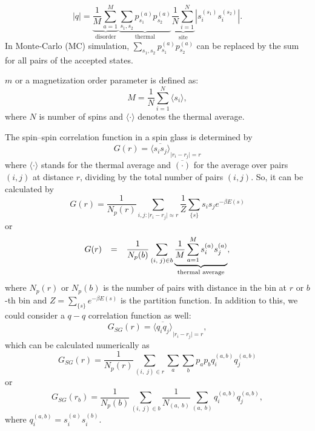 \documentclass[
    aps,
    prb,
    reprint,           %
    superscriptaddress,%
    amsmath,amssymb,
    floatfix
]{revtex4-2}
\begin{document}
 \begin{equation}
\left|q\right|=\underset{\text{disorder}}{\underbrace{\frac{1}{M}\sum_{a=1}^M}}\underset{\text{thermal}}{\underbrace{\sum_{s_1,s_2} p_{s_1}^{(a)}p_{s_2}^{(a)}}}\underset{\text{site}}{\underbrace{\frac{1}{N}\sum_{i=1}^{N}}}\left|s_i^{\left(s_1\right)}s_i^{\left(s_2\right)}\right|.
 \label{eq:18}
\end{equation}
In Monte-Carlo (MC) simulation, $\sum_{s_1,s_2} p_{s_1}^{(a)}p_{s_2}^{(a)}$ can be replaced by the sum for all pairs of the accepted states.

$m$ or a magnetization order parameter is defined as:
\begin{equation}
M=\frac{1}{N}\sum_{i=1}^{N} \langle s_i\rangle,	
 \label{eq:19}
\end{equation}
where $N$ is number of spins and $\langle\cdot\rangle$ denotes the thermal average.

The spin–spin correlation function in a spin glass is determined by
\begin{equation}
G(r)={\overline{\langle s_is_j\rangle }}_{\mid r_i-r_j\mid =r}	
  \label{eq:20}
\end{equation}
where $\langle\cdot\rangle$ stands for the thermal average and $\overline{(\cdot )}$ for the average over pairs $(i, j)$ at distance $r$, dividing by the total number of pairs $(i, j)$. So, it can be calculated by
\begin{equation}
G(r)=\frac{1}{N_p(r)}\sum_{i,j:\mid r_i-r_j\mid \approx r}\frac{1}{Z}\sum_{\{s\}} s_i s_j e^{-\beta E\left({s}\right)} 
  \label{eq:21}
\end{equation}
or 
\begin{equation}
G(r)\text{\; \,}=\text{\; \,}\frac{1}{N_p(b)}\sum_{\left(i,\; j\right)\in b}\underset{\text{thermal\ average}}{\underbrace{\frac{1}{M}\sum_{a=1}^{M} s_i^{(a)}s_j^{(a)}}},
  \label{eq:22}
\end{equation}
where $N_p(r)$ or $N_p(b)$ is the number of pairs with distance in the bin at $r$ or $b$-th bin and $Z=\sum_{\{s\}} e^{-\beta E\left({s}\right)}$ is the partition function.
In addition to this, we could consider a $q-q$ correlation function as well:
\begin{equation}
G_{SG}(r)={\overline{\langle q_iq_j\rangle }}_{\mid r_i-r_j\mid =r}, 
  \label{eq:23}
\end{equation}
which can be calculated numerically as
\begin{equation}
G_{SG}(r)=\frac{1}{N_p(r)}\sum_{\left(i,\; j\right)\in r}\sum_{a} \sum_{b} p_{a}p_{b}q_i^{(a,b)}q_j^{(a,b)}
  \label{eq:24}
\end{equation}
or
\begin{equation}
G_{SG}\left(r_{b}\right)=\frac{1}{N_p(b)}\sum_{\left(i,\; j\right)\in b} \frac{1}{N_{\left(a,\; b\right)}}\sum_{\left(a,\; b\right)} q_i^{(a,b)}q_j^{(a,b)},
  \label{eq:25}
\end{equation}
where $q_i^{(a,b)}=s_i^{(a)}s_i^{(b)}$.
\end{document}
